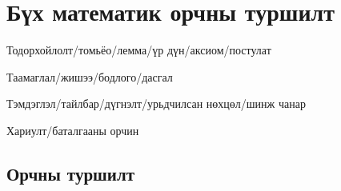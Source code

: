 \documentclass[mn]{../../elegantbook}
\begin{document}
\chapter{Бүх математик орчны туршилт}
\begin{introduction}
\item Тодорхойлолт/томьёо/лемма/үр дүн/аксиом/постулат
\item Таамаглал/жишээ/бодлого/дасгал
\item Тэмдэглэл/тайлбар/дүгнэлт/урьдчилсан нөхцөл/шинж чанар
\item Хариулт/баталгааны орчин
\end{introduction}

\section{Орчны туршилт}
\end{document}

